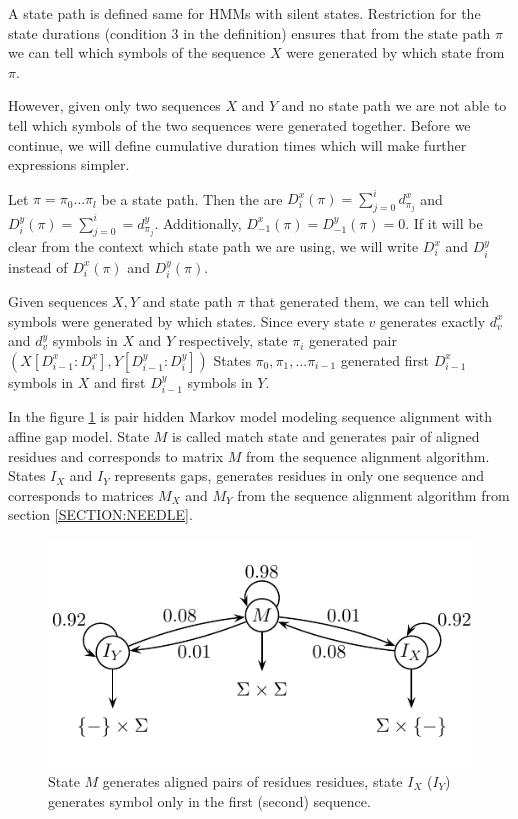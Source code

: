 A state path is defined same for HMMs with silent states. Restriction for the
state durations (condition $3$ in the definition) ensures
that from the state path $\pi$ we can tell which symbols of the sequence $X$
were generated by which state from $\pi$.

However, given only two sequences $X$ and $Y$ and no state path we are not able
to tell which symbols of the two sequences were generated together. Before we
continue, we will define cumulative duration times which will make further
expressions simpler.

\begin{definition}
Let $\pi=\pi_0\dots\pi_l$ be a state path. Then the  are
$D^x_i(\pi)=\sum_{j=0}^{i}d^x_{\pi_j}$ and $D^y_i(\pi)=\sum_{j=0}^{i}=d^y_{\pi_j}$.
Additionally, $D^x_{-1}(\pi)=D^y_{-1}(\pi)=0$. If it will be clear from the context
which state path we are using, we will write $D^x_i$ and $D^y_i$ instead of
$D^x_i(\pi)$ and $D^y_i(\pi)$.
\end{definition}

Given sequences $X,Y$ and state path $\pi$ that generated them, we 
can tell which symbols were generated by which states. Since every state $v$
generates exactly $d^x_v$ and $d^y_v$ symbols in $X$ and $Y$ respectively,
state $\pi_i$ generated pair $(X[D^x_{i-1}:D^x_{i}],Y[D^y_{i-1}:D^y_{i}])$
States $\pi_0,\pi_1,\dots\pi_{i-1}$ generated first $D^x_{i-1}$ symbols in $X$
and first $D^y_{i-1}$ symbols in $Y$. 


\begin{example}
In the figure \ref{FIGURE:EXAMPLEPAIRHMM} is pair hidden Markov model modeling
sequence alignment with affine gap model. State $M$ is called match state and
generates pair of aligned residues and corresponds to matrix $M$ from the sequence
alignment algorithm. States $I_X$ and $I_Y$ represents gaps,
generates residues in only one sequence and corresponds to matrices $M_X$ and
$M_Y$ from the sequence alignment algorithm from section \ref{SECTION:NEEDLE}.
\begin{figure}
\begin{center}
\includegraphics{../figures/simplePairHMM.pdf}
\end{center}
\caption[Example of pair hidden Markov model.]{
State $M$ generates aligned pairs of residues residues, state $I_X$ ($I_Y$) generates
symbol only in the first (second) sequence.
}\label{FIGURE:EXAMPLEPAIRHMM}
\end{figure}
\end{example}

